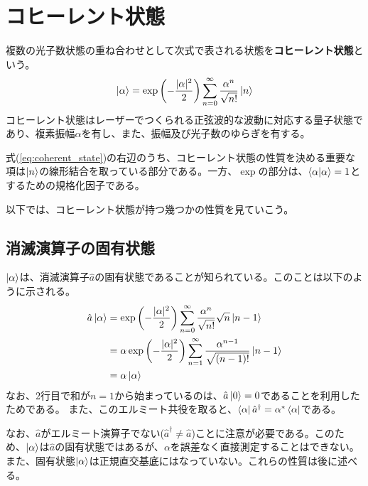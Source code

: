 \section{コヒーレント状態}
複数の光子数状態の重ね合わせとして次式で表される状態を\textbf{コヒーレント状態}という。
\begin{equation}
  \ket \alpha = \exp \left( -\frac{|\alpha|^2}{2} \right)\sum_{n = 0}^{\infty}\frac{\alpha^n}{\sqrt{n!}} \ket n
  \label{eq:coherent_state}
\end{equation}
コヒーレント状態はレーザーでつくられる正弦波的な波動に対応する量子状態であり、複素振幅$\alpha$を有し、また、振幅及び光子数のゆらぎを有する。

式(\ref{eq:coherent_state})の右辺のうち、コヒーレント状態の性質を決める重要な項は$\ket n$の線形結合を取っている部分である。一方、$\exp$の部分は、$\braket {\alpha|\alpha} = 1$とするための規格化因子である。

以下では、コヒーレント状態が持つ幾つかの性質を見ていこう。

\subsection{消滅演算子の固有状態}
$\ket \alpha$は、消滅演算子$\hat a$の固有状態であることが知られている。このことは以下のように示される。
\begin{equation}
\begin{aligned}
	  \hat a \ket \alpha &= \exp\left(-\frac{|\alpha|^2}{2}\right)\sum_{n = 0}^\infty \frac{\alpha^n}{\sqrt{n!}}\sqrt n \ket{n - 1}\\
	  &=\alpha \exp\left(-\frac{|\alpha|^2}{2}\right)\sum_{n = 1}^\infty\frac{\alpha^{n - 1}}{\sqrt{(n - 1)!}}\ket{n - 1}\\
	  &=\alpha \ket \alpha
\end{aligned}
\end{equation}
なお、2行目で和が$n = 1$から始まっているのは、$\hat a\ket 0 = 0$であることを利用したためである。
また、このエルミート共役を取ると、$\bra \alpha \hat a^\dagger = \alpha^* \bra \alpha$である。

なお、$\hat a$がエルミート演算子でない($\hat a^\dagger \neq \hat a$)ことに注意が必要である。このため、$\ket \alpha$は$\hat a$の固有状態ではあるが、$\alpha$を誤差なく直接測定することはできない。また、固有状態$\ket \alpha$は正規直交基底にはなっていない。これらの性質は後に述べる。

